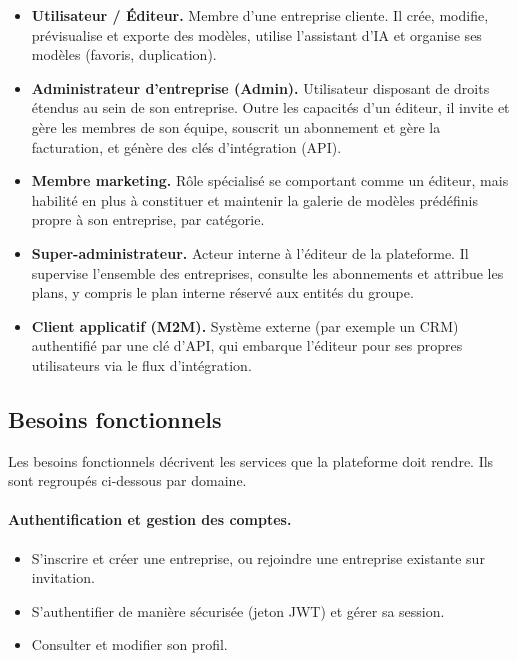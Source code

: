 \documentclass[12pt,a4paper,oneside]{report}
\begin{document}
\begin{itemize}[leftmargin=1.4cm]
  \item \textbf{Utilisateur / Éditeur.} Membre d'une entreprise cliente. Il
  crée, modifie, prévisualise et exporte des modèles, utilise l'assistant
  d'IA et organise ses modèles (favoris, duplication).

  \item \textbf{Administrateur d'entreprise (Admin).} Utilisateur disposant
  de droits étendus au sein de son entreprise. Outre les capacités d'un
  éditeur, il invite et gère les membres de son équipe, souscrit un
  abonnement et gère la facturation, et génère des clés d'intégration
  (API).

  \item \textbf{Membre marketing.} Rôle spécialisé se comportant comme un
  éditeur, mais habilité en plus à constituer et maintenir la galerie de
  modèles prédéfinis propre à son entreprise, par catégorie.

  \item \textbf{Super-administrateur.} Acteur interne à l'éditeur de la
  plateforme. Il supervise l'ensemble des entreprises, consulte les
  abonnements et attribue les plans, y compris le plan interne réservé aux
  entités du groupe.

  \item \textbf{Client applicatif (M2M).} Système externe (par exemple un
  CRM) authentifié par une clé d'API, qui embarque l'éditeur pour ses
  propres utilisateurs via le flux d'intégration.
\end{itemize}

\subsection{Besoins fonctionnels}
Les besoins fonctionnels décrivent les services que la plateforme doit
rendre. Ils sont regroupés ci-dessous par domaine.

\paragraph{Authentification et gestion des comptes.}
\begin{itemize}[leftmargin=1.4cm,nosep]
  \item S'inscrire et créer une entreprise, ou rejoindre une entreprise
  existante sur invitation.
  \item S'authentifier de manière sécurisée (jeton JWT) et gérer sa
  session.
  \item Consulter et modifier son profil.
\end{itemize}
\end{document}
